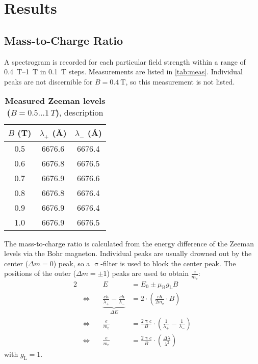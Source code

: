 \chapter{Results}
\section{Mass-to-Charge Ratio}
A spectrogram is recorded for each particular field strength within a range of \SIrange{0.4}{1}{\tesla} in \SI{0.1}{\tesla} steps.
Measurements are listed in \autoref{tab:meas}.
Individual peaks are not discernible for $B = \SI{0.4}{\tesla}$, so this measurement is not listed.

\begin{table}[tbp]
	\centering
	\caption[Measured Zeeman levels ($B = \num{0.5} \dots \SI{1}{T}$)]{\textbf{Measured Zeeman levels ($B = \num{0.5} \dots \SI{1}{T}$)}, description}
	\label{tab:meas}
	\begin{tabular}{SSS}
		\toprule
		{$B$ (\si{\tesla})}& {$\lambda_+$ (\si{\angstrom})}& {$\lambda_-$ (\si{\angstrom})}\\
		&	6676.6&	6676.4\\
		0.6&	6676.8&	6676.5\\
		0.7&	6676.9&	6676.6\\
		0.8&	6676.8&	6676.4\\
		0.9&	6676.9&	6676.4\\
		1.0&	6676.9&	6676.5\\
		\bottomrule
	\end{tabular}
\end{table}

The mass-to-charge ratio is calculated from the energy difference of the Zeeman levels via the Bohr magneton.
Individual peaks are usually drowned out by the center ($\Delta m = 0$) peak, so a $\upsigma$-filter is used to block the center peak.
The positions of the outer ($\Delta m = \pm 1$) peaks are used to obtain $\frac{e}{m_\text{e}}$:
\begin{alignat}{2}
	& &E &= E_0 \pm \mu_\text{B} g_\text{L} B\\
	&\Leftrightarrow \quad &\underbrace{\frac{c h}{\lambda_+} - \frac{c h}{\lambda_-}}_{\Delta E} &=
	2 \cdot \left(\frac{e \hbar}{2 m_\text{e}} \cdot B \right)\\
	&\Leftrightarrow &\frac{e}{m_\text{e}} &= \frac{2 \uppi c}{B} \cdot \left(\frac{1}{\lambda_+} - \frac{1}{\lambda_-}\right)\\
	&\Leftrightarrow &\frac{e}{m_\text{e}} &= \frac{2 \uppi c}{B} \cdot \left(\frac{\Delta \lambda}{\lambda^2}\right)
\end{alignat}
with $g_\text{L} = 1$.

